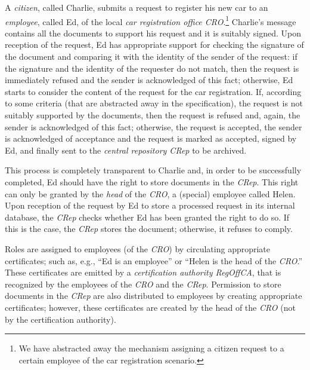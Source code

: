 \documentclass[conference]{IEEEtran}
\begin{document}
\begin{LONG}
A \emph{citizen}, called Charlie, submits a request to register his new
car to an \emph{employee}, called Ed, of the local \emph{car registration office CRO}.\footnote{We have abstracted away the mechanism assigning a citizen request to a certain employee of the car
 registration scenario.} Charlie's message contains all the documents to
support his request and it is suitably signed.  Upon reception of the
request, Ed has appropriate support for checking the signature of
the document and comparing it with the identity of the sender of the
request: if the signature and the identity of the requester do not
match, then the request is immediately refused and the sender is
acknowledged of this fact; otherwise, Ed starts to consider the
content of the request for the car registration. If, according to some
criteria (that are abstracted away in the specification), the request
is not suitably supported by the documents, then the request is
refused and, again, the sender is acknowledged of this fact; otherwise, the request is 
accepted, the sender is acknowledged of
acceptance and the request is marked as accepted, signed by Ed, and
finally sent to the \emph{central repository CRep} to be archived.

This process is completely transparent to Charlie and, in order to be
successfully completed, Ed should have the right to store documents
in the \emph{CRep}.  This right 
can only be granted by the \emph{head} of the \emph{CRO}, 
a (special) employee called Helen.
Upon reception of the request by Ed to store a processed request in
its internal database, the \emph{CRep} checks whether Ed has
been granted the right to do so. If this is the case, the \emph{CRep}
stores the document; otherwise, it refuses to comply.

Roles are assigned to employees (of the \emph{CRO}) by
circulating appropriate certificates; such as, e.g., ``Ed is an
employee'' or ``Helen is the head of the \emph{CRO}.''
These certificates are emitted by a \emph{certification authority RegOffCA}, that 
is recognized by the employees of the \emph{CRO} and the \emph{CRep}. Permission to store documents in the
\emph{CRep} are also distributed to employees by creating
appropriate certificates; however, these certificates are created by
the head of the \emph{CRO} (not by the certification authority).  


\end{LONG}
\end{document}
